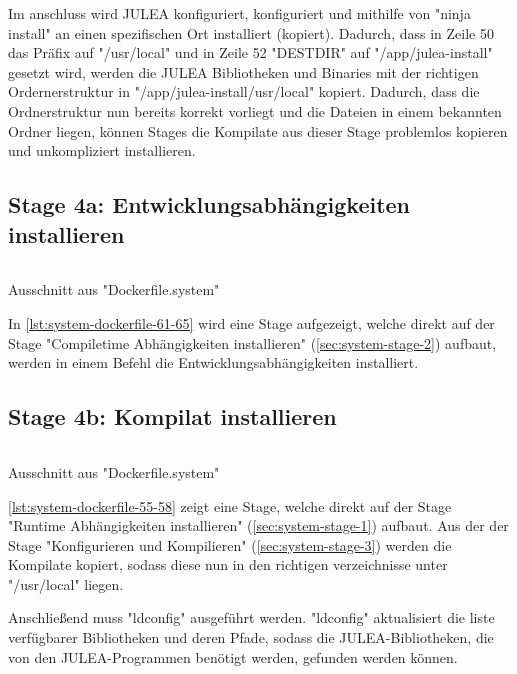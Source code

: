 Im anschluss wird JULEA konfiguriert, konfiguriert und mithilfe von "ninja install" an einen spezifischen Ort installiert (kopiert). Dadurch, dass in Zeile 50 das Präfix auf "/usr/local" und in Zeile 52 "DESTDIR" auf "/app/julea-install" gesetzt wird, werden die JULEA Bibliotheken und Binaries mit der richtigen Ordernerstruktur in "/app/julea-install/usr/local" kopiert. Dadurch, dass die Ordnerstruktur nun bereits korrekt vorliegt und die Dateien in einem bekannten Ordner liegen, können Stages die Kompilate aus dieser Stage problemlos kopieren und unkompliziert installieren.

\subsection{Stage 4a: Entwicklungsabhängigkeiten installieren} \label{sec:system-stage-4a}

\begin{listing}[H]
    \inputminted[firstline=61,lastline=65]{dockerfile}{./code-examples/Dockerfile.system}
    \caption{Ausschnitt aus "Dockerfile.system"}
    \label{lst:system-dockerfile-61-65}
\end{listing}

In \cref{lst:system-dockerfile-61-65} wird eine Stage aufgezeigt, welche direkt auf der Stage "Compiletime Abhängigkeiten installieren" (\cref{sec:system-stage-2}) aufbaut, werden in einem Befehl die Entwicklungsabhängigkeiten installiert.

\subsection{Stage 4b: Kompilat installieren} \label{sec:system-stage-4b}

\begin{listing}[H]
    \inputminted[firstline=55,lastline=58]{dockerfile}{./code-examples/Dockerfile.system}
    \caption{Ausschnitt aus "Dockerfile.system"}
    \label{lst:system-dockerfile-55-58}
\end{listing}


\cref{lst:system-dockerfile-55-58} zeigt eine Stage, welche direkt auf der Stage "Runtime Abhängigkeiten installieren" (\cref{sec:system-stage-1}) aufbaut. Aus der der Stage "Konfigurieren und Kompilieren" (\cref{sec:system-stage-3}) werden die Kompilate kopiert, sodass diese nun in den richtigen verzeichnisse unter "/usr/local" liegen.

Anschließend muss "ldconfig" ausgeführt werden. "ldconfig" aktualisiert die liste verfügbarer Bibliotheken und deren Pfade, sodass die JULEA-Bibliotheken, die von den JULEA-Programmen benötigt werden, gefunden werden können.

